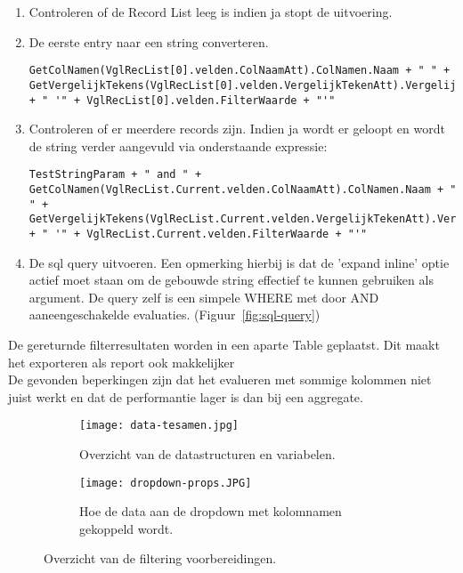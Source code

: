\begin{itemize}
    \begin{enumerate}
        \item Controleren of de Record List leeg is indien ja stopt de uitvoering.
        \item De eerste entry naar een string converteren. 
\begin{lstlisting}
GetColNamen(VglRecList[0].velden.ColNaamAtt).ColNamen.Naam + " " + GetVergelijkTekens(VglRecList[0].velden.VergelijkTekenAtt).VergelijkTekens.Teken + " '" + VglRecList[0].velden.FilterWaarde + "'"
\end{lstlisting}
        \item Controleren of er meerdere records zijn. Indien ja wordt er geloopt en wordt de string verder aangevuld via onderstaande expressie:
\begin{lstlisting}
TestStringParam + " and " + GetColNamen(VglRecList.Current.velden.ColNaamAtt).ColNamen.Naam + " " + GetVergelijkTekens(VglRecList.Current.velden.VergelijkTekenAtt).VergelijkTekens.Teken + " '" + VglRecList.Current.velden.FilterWaarde + "'"
\end{lstlisting}
        \item De sql query uitvoeren. Een opmerking hierbij is dat de 'expand inline' optie actief moet staan om de gebouwde string effectief te kunnen gebruiken als argument. De query zelf is een simpele WHERE met door AND aaneengeschakelde evaluaties. (Figuur~\ref{fig:sql-query})
    \end{enumerate}
    De gereturnde filterresultaten worden in een aparte Table geplaatst. Dit maakt het exporteren als report ook makkelijker\\
    De gevonden beperkingen zijn dat het evalueren met sommige kolommen niet juist werkt en dat de performantie lager is dan bij een aggregate.
\end{itemize}


\begin{figure}[h!]
    \centering
    \begin{subfigure}[b]{0.3\linewidth}
        \texttt{[image: data-tesamen.jpg]}
        \caption{Overzicht van de datastructuren en variabelen.}
    \end{subfigure}
    \begin{subfigure}[b]{0.5\linewidth}
        \texttt{[image: dropdown-props.JPG]}
        \caption{Hoe de data aan de dropdown met kolomnamen gekoppeld wordt.}
    \end{subfigure}
    \caption{Overzicht van de filtering voorbereidingen.}
    \label{fig:data-en-dropdown}
\end{figure}

